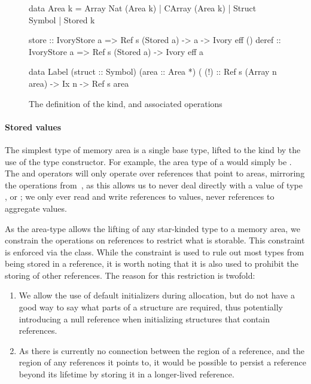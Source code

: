 \begin{figure}[ht]
\begin{code}
data Area k = Array Nat (Area k)
            | CArray (Area k)
            | Struct Symbol
            | Stored k


store :: IvoryStore a
      => Ref s (Stored a) -> a -> Ivory eff ()
deref :: IvoryStore a
      => Ref s (Stored a) -> Ivory eff a

data Label (struct :: Symbol) (area :: Area *)
(%
(!)  :: Ref s (Array n area) -> Ix n -> Ref s area
\end{code}
\caption{The definition of the  kind, and associated operations}
\label{fig:area-def}
\end{figure}

\paragraph{Stored values}
The simplest type of memory area is a single base type, lifted to the 
kind by the use of the  type constructor.  For example, the area type
of a  would simply be . The  and
 operators will only operate over references that point to  areas,
mirroring the operations from~\cite{memareas}, as this allows us to never deal
directly with a value of type , or ; we only ever read and
write references to values, never references to aggregate values.

As the  area-type allows the lifting of any star-kinded type to a
memory area, we constrain the operations on references to restrict what is
storable.  This constraint is enforced via the  class.  While the
 constraint is used to rule out most types from being stored in a
reference, it is worth noting that it is also used to prohibit the storing of other
references.  The reason for this restriction is twofold:

\begin{enumerate}
\item We allow the use of default initializers during allocation, but do not have
  a good way to say what parts of a structure are required, thus potentially
  introducing a null reference when initializing structures that contain
  references.
\item As there is currently no connection between the region of a reference, and
  the region of any references it points to, it would be possible to persist a
  reference beyond its lifetime by storing it in a longer-lived reference.
\end{enumerate}

